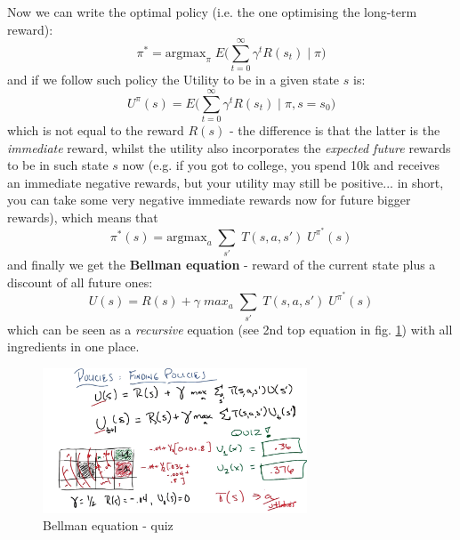 \documentclass[11pt]{article}
\begin{document}
Now we can write the optimal policy (i.e. the one optimising the long-term reward):
\[ \pi^* = \text{argmax}_\pi \; E \big(\sum_{t=0}^{\infty} \gamma^t R(s_t) \; |\; \pi \big)
\]
and if we follow such policy the Utility to be in a given state $s$ is:
\[ U^{\pi}(s) = E \big(\sum_{t=0}^{\infty} \gamma^t R(s_t) \; |\; \pi, s=s_0 \big)  
\]
which is not equal to the reward $R(s)$ - the difference is that the latter is the \textit{immediate} reward, whilst the utility also incorporates the \textit{expected future} rewards to be in such state $s$ now (e.g. if you got to college, you spend 10k and receives an immediate negative rewards, but your utility may still be positive... in short, you can take some very negative immediate rewards now for future bigger rewards), which means that
\[ \pi^*(s) = \text{argmax}_a \; \sum_{s'} \; T(s, a, s') \; U^{\pi^*}(s)
\]
and finally we get the \textbf{Bellman equation} - reward of the current state plus a discount of all future ones: 
\[   U(s) = R(s) + \gamma \; max_a \; \sum_{s'} \; T(s, a, s') \; U^{\pi^*}(s)
\]
which can be seen as a \textit{recursive} equation (see 2nd top equation in fig. \ref{bellman_quiz}) with all ingredients in one place.
\begin{figure}[htbp] 
	\centering
	\includegraphics[width=0.7\textwidth]{pics/bellman_quiz}
	\caption{Bellman equation - quiz} 
	\label{bellman_quiz}
\end{figure}
\end{document}
